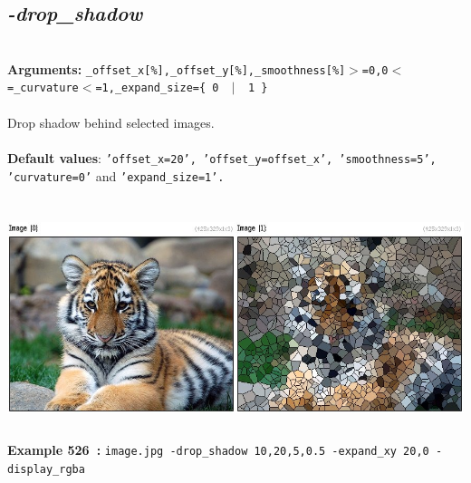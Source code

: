 \documentclass[a4paper,11pt,twoside]{book}
\begin{document}
\subsection{\emph{-drop\_shadow} }\vspace*{-0.5em}
~\\\textbf{Arguments: } 
{\small \texttt{\_offset\_x[\%],\_offset\_y[\%],\_smoothness[\%]$>$=0,0$<$=\_curvature$<$=1,\_expand\_size=\{ 0 ~$|$~ 1 \}}}\\~\\
Drop shadow behind selected images.
~\\~\\\textbf{Default values}: {\small \texttt{'offset\_x=20', 'offset\_y=offset\_x', 'smoothness=5', 'curvature=0'} and \texttt{'expand\_size=1'.}}
\begin{center}\includegraphics[keepaspectratio=true,height=7cm,width=\textwidth]{img/gmic_def526.jpg}\\
{\footnotesize \textbf{Example 526~:} \texttt{image.jpg -drop\_shadow 10,20,5,0.5 -expand\_xy 20,0 -display\_rgba}}
\end{center}
\end{document}
